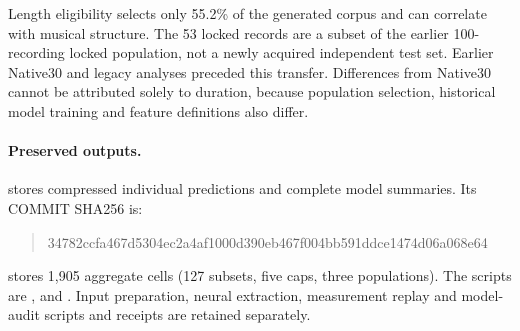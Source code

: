 Length eligibility selects only 55.2\% of the generated corpus and can correlate
with musical structure. The 53 locked records are a subset of the earlier
100-recording locked population, not a newly acquired independent test set.
Earlier Native30 and legacy analyses preceded this transfer. Differences from
Native30 cannot be attributed solely to duration, because population selection,
historical model training and feature definitions also differ.

\paragraph{Preserved outputs.}
 stores compressed individual
predictions and complete model summaries. Its COMMIT SHA256 is:
\begin{quote}\scriptsize\ttfamily
34782ccfa467d5304ec2a4af1000d390eb467f004bb591ddce1474d06a068e64
\end{quote}
 stores 1,905 aggregate cells
(127 subsets, five caps, three populations). The scripts are
,  and
. Input preparation, neural extraction,
measurement replay and model-audit scripts and receipts are retained separately.
